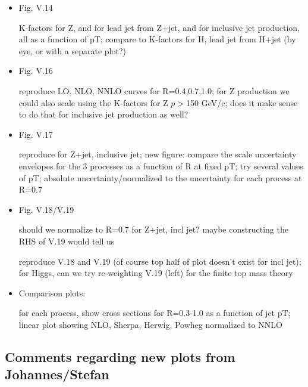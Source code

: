\documentclass[aps,prd,onecolumn,fleqn,superscriptaddress,groupedaddress,nofootinbib,preprintnumbers,nobalancelastpage]{revtex4}
\begin{document}
\begin{itemize}
\item 

Fig. V.14

K-factors for Z,  and for lead jet from Z+jet, and for inclusive jet production, all as a function of pT; compare to K-factors for H, lead jet from H+jet (by eye, or with a separate plot?)

\item
Fig. V.16

reproduce LO, NLO, NNLO curves for R=0.4,0.7,1.0; for Z production we could also scale using the K-factors for Z $p\gt$150 GeV/c; does it make sense to do that for inclusive jet production as well? 

\item
Fig. V.17

reproduce for Z+jet, inclusive jet; new figure: compare the scale uncertainty envelopes for the 3 processes as a function of R at fixed pT; try several values of pT;  absolute uncertainty/normalized to the uncertainty for each process at R=0.7

\item

Fig. V.18/V.19

should we normalize to R=0.7 for Z+jet, incl jet? maybe constructing the RHS of V.19 would tell us

reproduce V.18 and V.19 (of course top half of plot doesn't exist for incl jet); for Higgs, can we try re-weighting V.19 (left) for the finite top mass theory

\item
Comparison plots:

for each process, show cross sections for R=0.3-1.0 as a function of jet pT; linear plot showing NLO, Sherpa, Herwig, Powheg normalized to NNLO



\end{itemize}

\subsection{Comments regarding new plots from Johannes/Stefan}
\end{document}
